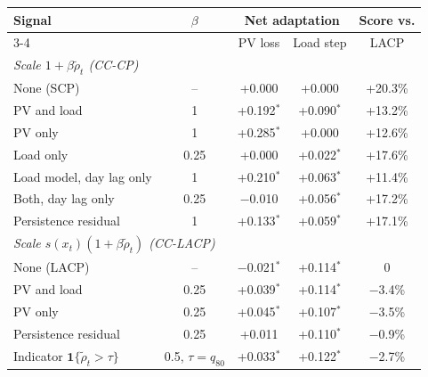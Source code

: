 \begin{tabular}{|l|c|c|c|c|}
\hline
\multirow{2}{*}{Signal} & \multirow{2}{*}{$\beta$} & \multicolumn{2}{c|}{Net adaptation} & Score vs.\\
\cline{3-4}
 & & PV loss & Load step & LACP\\
\hline
\multicolumn{5}{|l|}{\emph{Scale $1+\beta\tilde\rho_t$ (CC-CP)}}\\
\quad None (SCP) & -- & +0.000 & +0.000 & +20.3\%\\
\quad PV and load & 1 & +0.192$^{*}$ & +0.090$^{*}$ & +13.2\%\\
\quad PV only & 1 & +0.285$^{*}$ & +0.000 & +12.6\%\\
\quad Load only & 0.25 & +0.000 & +0.022$^{*}$ & +17.6\%\\
\quad Load model, day lag only & 1 & +0.210$^{*}$ & +0.063$^{*}$ & +11.4\%\\
\quad Both, day lag only & 0.25 & $-$0.010 & +0.056$^{*}$ & +17.2\%\\
\quad Persistence residual & 1 & +0.133$^{*}$ & +0.059$^{*}$ & +17.1\%\\
\hline
\multicolumn{5}{|l|}{\emph{Scale $s(x_t)(1+\beta\tilde\rho_t)$ (CC-LACP)}}\\
\quad None (LACP) & -- & $-$0.021$^{*}$ & +0.114$^{*}$ & 0\\
\quad PV and load & 0.25 & +0.039$^{*}$ & +0.114$^{*}$ & $-$3.4\%\\
\quad PV only & 0.25 & +0.045$^{*}$ & +0.107$^{*}$ & $-$3.5\%\\
\quad Persistence residual & 0.25 & +0.011 & +0.110$^{*}$ & $-$0.9\%\\
\quad Indicator $\mathbf{1}\{\tilde\rho_t>\tau\}$ & 0.5, $\tau=q_{80}$ & +0.033$^{*}$ & +0.122$^{*}$ & $-$2.7\%\\
\hline
\end{tabular}
